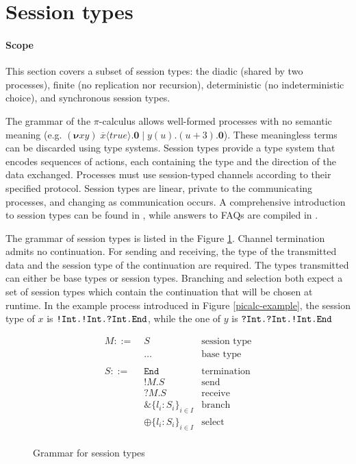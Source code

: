 \documentclass{mproj}
\newcommand{\PO}{\mathbf{0}}
\newcommand{\comp}[2]{#1 \mid #2}
\newcommand{\new}[2]{(\boldsymbol{\nu} #1 #2) \;}
\newcommand{\cout}[2]{\overline{#1}\langle#2\rangle.}
\newcommand{\cin}[2]{#1(#2).}
\newcommand{\picalc}{$\pi$-calculus}
\newcommand{\type}{\texttt}
\newcommand{\End}{\type{End}}
\newcommand{\Send}[1]{!#1.}
\newcommand{\Recv}[1]{?#1.}
\newcommand{\Select}{\oplus}
\newcommand{\Branch}{\&}
\begin{document}
\section{Session types}\label{session-types}

\paragraph{Scope} This section covers a subset of session types: the diadic (shared by two processes), finite (no replication nor recursion), deterministic (no indeterministic choice), and synchronous session types.

The grammar of the \picalc{} allows well-formed processes with no semantic meaning (e.g. $\new{x}{y} \comp {\cout{x}{true}\PO} {\cin{y}{u}(u+3).\PO}$). These meaningless terms can be discarded using type systems. Session types \cite{Honda1993, Takeuchi1994, Honda1998} provide a type system that encodes sequences of actions, each containing the type and the direction of the data exchanged. Processes must use session-typed channels according to their specified protocol. Session types are linear, private to the communicating processes, and changing as communication occurs. A comprehensive introduction to session types can be found in \cite{Vasconcelos2009}, while answers to FAQs are compiled in \cite{Dezani-ciancaglini2010}.

The grammar of session types is listed in the Figure \ref{session-types-grammar}. Channel termination admits no continuation. For sending and receiving, the type of the transmitted data and the session type of the continuation are required. The types transmitted can either be base types or session types. Branching and selection both expect a set of session types which contain the continuation that will be chosen at runtime. In the example process introduced in Figure \ref{picalc-example}, the session type of $x$ is $\type{\Send{Int}\Send{Int}\Recv{Int}\End}$, while the one of $y$ is $\type{\Recv{Int}\Recv{Int}\Send{Int}\End}$

\begin{figure}[H]
    \begin{align*}
        M ::= \; &S                               & \text{session type}\\
                 &\ldots                          & \text{base type} \\
                 \\
        S ::= \; &\type{End}                      & \text{termination} \\
                 &\Send{M}S                       & \text{send} \\
                 &\Recv{M}S                       & \text{receive} \\
                 &\Branch \{l_i : S_i\}_{i \in I} & \text{branch} \\
                 &\Select \{l_i : S_i\}_{i \in I} & \text{select} \\
    \end{align*}
    \caption{Grammar for session types}
    \label{session-types-grammar}
\end{figure}
\end{document}
